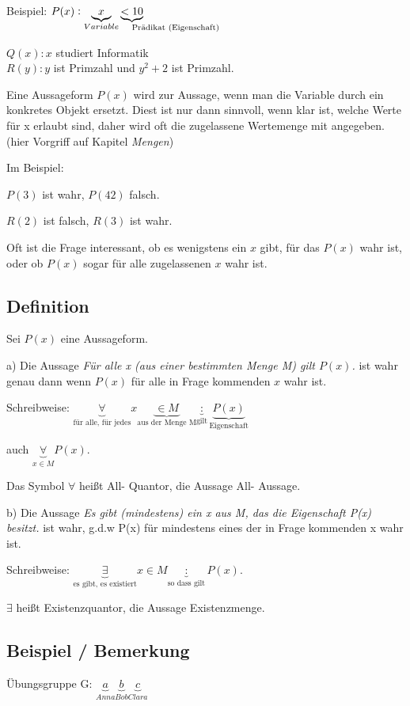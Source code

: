 \documentclass[a4paper, 12pt, twoside] {article}
\begin{document}
Beispiel:
$P(x): \underbrace{x}_{Variable} \underbrace{< 10}_{\mathrlap{\text{Prädikat (Eigenschaft)}}}$

$Q(x): x$ studiert Informatik \\
$R(y): y$ ist Primzahl und $y^2+2$ ist Primzahl.

Eine Aussageform $P(x)$ wird zur Aussage, wenn man die Variable durch ein konkretes Objekt ersetzt. Diest ist nur dann sinnvoll, wenn klar ist, welche Werte für x erlaubt sind, daher wird oft die zugelassene Wertemenge mit angegeben. (hier Vorgriff auf Kapitel \textit{Mengen})

Im Beispiel:

$P(3)$ ist wahr, $P(42)$ falsch.

$R(2)$ ist falsch, $R(3)$ ist wahr.

Oft ist die Frage interessant, ob es wenigstens ein $x$ gibt, für das $P(x)$ wahr ist, oder ob $P(x)$ sogar für alle zugelassenen $x$ wahr ist.

\subsection{Definition}
Sei $P(x)$ eine Aussageform.

a) Die Aussage \textit{Für alle x (aus einer bestimmten Menge M) gilt $P(x)$.} ist wahr genau dann wenn $P(x)$ für alle in Frage kommenden $x$ wahr ist.

Schreibweise: $\underbrace{\forall}_{\text{für alle, für jedes}} x \underbrace{\in M}_{\text{aus der Menge M}} \underbrace{:}_{\text{gilt}} \underbrace{P(x)}_{\text{Eigenschaft}}$

auch $\underbrace{\forall}_{x \in M} P(x)$.

Das Symbol $\forall$ heißt All- Quantor, die Aussage All- Aussage.

b) Die Aussage \textit{Es gibt (mindestens) ein x aus M, das die Eigenschaft P(x) besitzt.} ist wahr, g.d.w P(x) für mindestens eines der in Frage kommenden x wahr ist.

Schreibweise: $\underbrace{\exists}_{\text{es gibt, es existiert}} x \in M \underbrace{:}_{\text{so dass gilt}} P(x)$.

$\exists$ heißt Existenzquantor, die Aussage Existenzmenge.

\subsection{Beispiel / Bemerkung}
Übungsgruppe G:
$\underbrace{a}_{Anna} \underbrace{b}_{Bob} \underbrace{c}_{Clara}$
\end{document}
